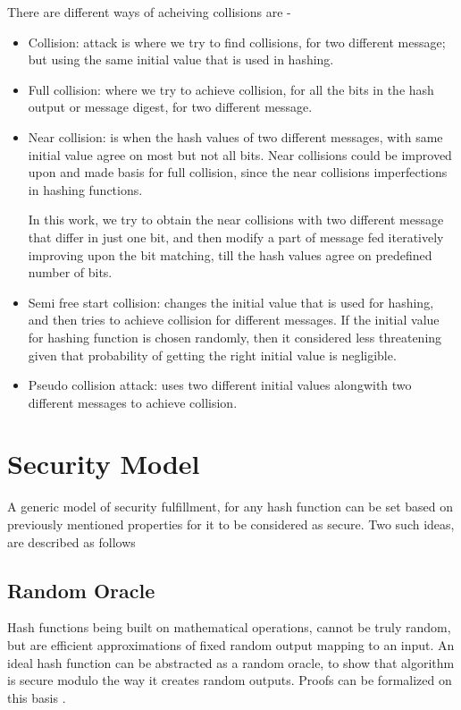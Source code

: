 There are different ways of acheiving collisions are \cite{00045}-
\begin{itemize}
\item Collision: attack is where we try to find collisions, for two different message; but using the same initial
value that is used in hashing.
\item Full collision: where we try to achieve collision, for all the bits in the hash output or message digest, for
two different message.
\item Near collision: is when the hash values of two different messages, with same initial value agree on most but
not all bits. Near collisions could be improved upon and made basis for full collision, since the near collisions
imperfections in hashing functions.

In this work, we try to obtain the near collisions with two different message that differ in just one bit, and then
modify a part of message fed iteratively improving upon the bit matching, till the hash values agree on predefined
number of bits.
\item Semi free start collision: changes the initial value that is used for hashing, and then tries to achieve 
collision for different messages. If the initial value for hashing function is chosen randomly, then it 
considered less threatening given that probability of getting the right initial value is negligible.
\item Pseudo collision attack: uses two different initial values alongwith two different messages to achieve 
collision.
\end{itemize}

\section{Security Model}

A generic model of security fulfillment, for any hash function can be set based on previously mentioned
properties for it to be considered as secure. Two such ideas, are described as follows 

  \subsection{ Random Oracle }
  Hash functions being built on mathematical operations, cannot be truly random, but are efficient
  approximations of fixed random output mapping to an input. An ideal hash function can be abstracted 
  as a random oracle, to show that algorithm is secure modulo the way it creates random outputs. Proofs
  can be formalized on this basis \cite{00018}.

